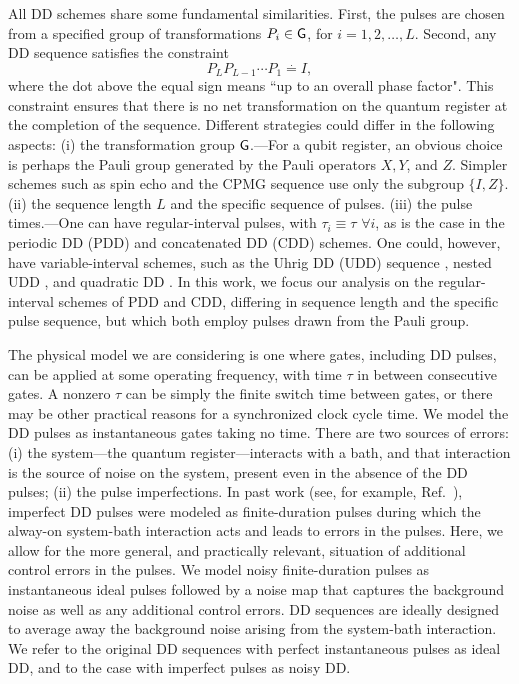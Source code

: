 \documentclass[twocolumn,pra,superscriptaddress]{revtex4-2}
\begin{document}
All DD schemes share some fundamental similarities. First, the pulses are chosen from a specified group of transformations $P_i \in \mathsf{G}$, for $i=1,2,\ldots, L$.
Second, any DD sequence satisfies the constraint
\begin{equation}\label{eq:fundamental-constraint}
    P_L P_{L-1} \cdots P_1 \stackrel{\textbf{.}}{=} I,
\end{equation}
where the dot above the equal sign means ``up to an overall phase factor". This constraint ensures that there is no net transformation on the quantum register at the completion of the sequence. 
Different strategies could differ in the following aspects:
(i) the transformation group $\mathsf{G}$.---For a qubit register, an obvious choice is perhaps the Pauli group generated by the Pauli operators $X,Y$, and $Z$. Simpler schemes such as spin echo \cite{Hahn1950} and the CPMG sequence \cite{Carr1954,Meiboom1958} use only the subgroup $\{I,Z\}$.  
(ii) the sequence length $L$ and the specific sequence of pulses.
(iii) the pulse times.---One can have regular-interval pulses, with $\tau_i\equiv \tau$ $\forall i$, as is the case in the periodic DD (PDD) \cite{viola1999dynamical} and concatenated DD (CDD) \cite{khodjasteh2005fault} schemes. One could, however, have variable-interval schemes, such as the Uhrig DD (UDD) sequence \cite{uhrig2007keeping}, nested UDD \cite{wang2011protection}, and quadratic DD \cite{kuo2011quadratic}.
In this work, we focus our analysis on the regular-interval schemes of PDD and CDD, differing in sequence length and the specific pulse sequence, but which both employ pulses drawn from the Pauli group. 

The physical model we are considering is one where gates, including DD pulses, can be applied at some operating frequency, with time $\tau$ in between consecutive gates. A nonzero $\tau$ can be simply the finite switch time between gates, or there may be other practical reasons for a synchronized clock cycle time. We model the DD pulses as instantaneous gates taking no time. There are two sources of errors: (i) the system---the quantum register---interacts with a bath, and that interaction is the source of noise on the system, present even in the absence of the DD pulses; (ii) the pulse imperfections. In past work (see, for example, Ref.~\cite{khodjasteh2005fault}), imperfect DD pulses were modeled as finite-duration pulses during which the alway-on system-bath interaction acts and leads to errors in the pulses. Here, we allow for the more general, and practically relevant, situation of additional control errors in the pulses. We model noisy finite-duration pulses as instantaneous ideal pulses followed by a noise map that captures the background noise as well as any additional control errors. DD sequences are ideally designed to average away the background noise arising from the system-bath interaction. We refer to the original DD sequences with perfect instantaneous pulses as ideal DD, and to the case with imperfect pulses as noisy DD.
\end{document}
